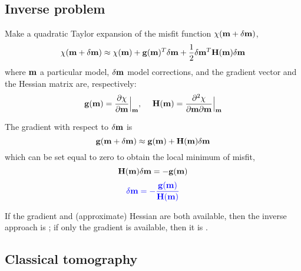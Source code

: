 \subsection{Inverse problem}
Make a quadratic Taylor expansion of the misfit function $\chi(\mathbf{m}+\delta\mathbf{m})$,
\[ \chi(\mathbf{m}+\delta\mathbf{m})\approx\chi(\mathbf{m})+\mathbf{g}(\mathbf{m})^T\delta\mathbf{m}+\frac{1}{2}\delta\mathbf{m}^T\mathbf{H}(\mathbf{m})\delta\mathbf{m} \]
where $\mathbf{m}$ a particular model, $\delta\mathbf{m}$ model corrections, and the gradient vector and the Hessian matrix are, respectively:
\[ \mathbf{g}(\mathbf{m})=\frac{\partial\chi}{\partial\mathbf{m}}\Big|_{\mathbf{m}} \text{,\hspace{5mm}} \mathbf{H}(\mathbf{m})=\frac{\partial^2\chi}{\partial\mathbf{m}\partial\mathbf{m}}\Big|_{\mathbf{m}} \]\par
The gradient with respect to $\delta\mathbf{m}$ is
\[ \mathbf{g}(\mathbf{m}+\delta\mathbf{m})\approx\mathbf{g}(\mathbf{m})+\mathbf{H}(\mathbf{m})\delta\mathbf{m} \]
which can be set equal to zero to obtain the local minimum of misfit,
\[ \mathbf{H}(\mathbf{m})\delta\mathbf{m}=-\mathbf{g}(\mathbf{m}) \]
\[ {\color{blue}\delta\mathbf{m}=-\frac{\mathbf{g}(\mathbf{m})}{\mathbf{H}(\mathbf{m})}} \]\par
If the gradient and (approximate) Hessian are both available, then the inverse approach is ; if only the gradient is available, then it is .\par
\subsection{Classical tomography}
